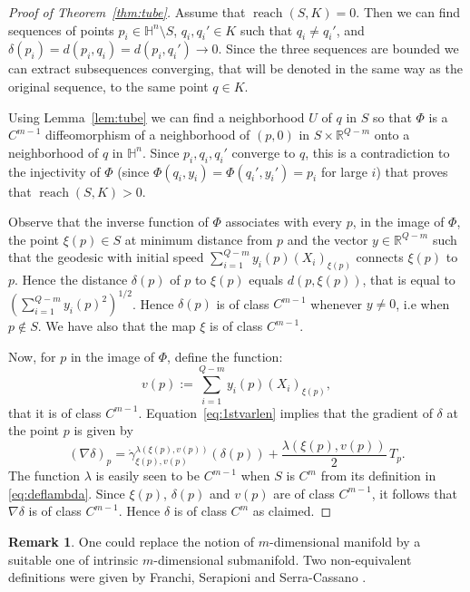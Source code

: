 \documentclass[10pt]{amsart}
\theoremstyle{definition}
\newtheorem{remark}[theorem]{Remark}
\theoremstyle{remark}
\numberwithin{equation}{section}
\begin{document}
\begin{proof}[Proof of Theorem~\ref{thm:tube}]
Assume that $\operatorname{reach}(S,K)=0$. Then we can find sequences of points $p_i\in{{\mathbb{H}}}^n\setminus S$, $q_i,q_i'\in K$ such that $q_i\neq q_i'$, and $\delta(p_i)=d(p_i,q_i)=d(p_i,q_i')\to 0$. Since the three sequences are bounded we can extract subsequences converging, that will be denoted in the same way as the original sequence, to the same point $q\in K$.

Using Lemma~\ref{lem:tube} we can find a neighborhood $U$ of $q$ in $S$ so that $\Phi$ is a $C^{m-1}$ diffeomorphism of a neighborhood of $(p,0)$ in $S\times{{\mathbb{R}}}^{Q-m}$ onto a neighborhood of $q$ in ${{\mathbb{H}}}^n$. Since $p_i,q_i,q_i'$ converge to $q$, this is a contradiction to the injectivity of $\Phi$ (since $\Phi(q_i,y_i)=\Phi(q_i',y_i')=p_i$ for large $i$) that proves that $\operatorname{reach}(S,K)>0$.

Observe that the inverse function of $\Phi$ associates with every $p$, in the image of $\Phi$, the point $\xi(p)\in S$ at minimum distance from $p$ and the vector $y\in{{\mathbb{R}}}^{Q-m}$ such that the geodesic with initial speed $\sum_{i=1}^{Q-m}y_i(p)(X_i)_{\xi(p)}$ connects $\xi(p)$ to $p$. Hence the distance $\delta(p)$ of $p$ to $\xi(p)$ equals $d(p,\xi(p))$, that is equal to $(\sum_{i=1}^{Q-m}y_i(p)^2)^{1/2}$. Hence $\delta(p)$ is of class $C^{m-1}$ whenever $y\neq 0$, i.e when $p\not\in S$. We have also that the map $\xi$ is of class $C^{m-1}$.

Now, for $p$ in the image of $\Phi$, define the function:
\[
v(p):=\sum_{i=1}^{Q-m}y_i(p)(X_i)_{\xi(p)},
\]
that it is of class $C^{m-1}$. Equation~\eqref{eq:1stvarlen} implies that the gradient of $\delta$ at the point $p$ is given by
\[
(\nabla\delta)_p=\dot{\gamma}_{\xi(p),v(p)}^{{\lambda}(\xi(p),v(p))}(\delta(p))+\frac{{\lambda}(\xi(p),v(p))}{2}\,T_p.
\]
The function $\lambda$ is easily seen to be $C^{m-1}$ when $S$ is $C^m$ from its definition in \eqref{eq:deflambda}. Since $\xi(p)$, $\delta(p)$ and $v(p)$ are of class $C^{m-1}$, it follows that $\nabla\delta$ is of class $C^{m-1}$. Hence $\delta$ is of class $C^m$ as claimed.
\end{proof}

\begin{remark}
One could replace the notion of $m$-dimensional manifold by a suitable one of intrinsic $m$-dimensional submanifold. Two non-equivalent definitions were given by Franchi, Serapioni and Serra-Cassano \cite{MR2313532}.
\end{remark}
\end{document}
